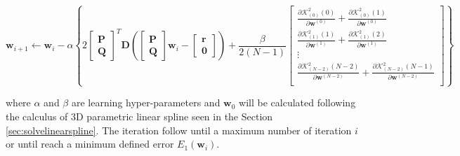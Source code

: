 \begin{equation}
\mathbf{w}_{i+1}
\leftarrow 
\mathbf{w}_{i}
-
\alpha
\left\{
2
\begin{bmatrix}
\mathbf{P}\\
\mathbf{Q}
\end{bmatrix}^{T}
\mathbf{D}
\left(
\begin{bmatrix}
\mathbf{P}\\
\mathbf{Q}
\end{bmatrix}
\mathbf{w}_{i}
-
\begin{bmatrix}
\mathbf{r}\\
\mathbf{0}
\end{bmatrix}
\right)
+
\frac{\beta}{2(N-1)}
\begin{bmatrix}
%
\frac{
\partial 
\mathcal{K}_{(0)}^{2}(0)
}{\partial \mathbf{w}^{(0)}}
+
\frac{
\partial 
\mathcal{K}_{(0)}^{2}(1)
}{\partial \mathbf{w}^{(0)}}\\[4pt]
%
\frac{
\partial 
\mathcal{K}_{(1)}^{2}(1)
}{\partial \mathbf{w}^{(1)}}
+
\frac{
\partial 
\mathcal{K}_{(1)}^{2}(2)
}{\partial \mathbf{w}^{(1)}}\\[4pt]
%
\vdots\\[4pt]
\frac{
\partial 
\mathcal{K}_{(N-2)}^{2}(N-2)
}{\partial \mathbf{w}^{(N-2)}}
+
\frac{
\partial 
\mathcal{K}_{(N-2)}^{2}(N-1)
}{\partial \mathbf{w}^{(N-2)}}\\
%
\end{bmatrix}
\right\}
\end{equation}

where $\alpha$ and $\beta$ are learning hyper-parameters and 
$\mathbf{w}_{0}$ 
will be calculated following the calculus of 3D parametric linear spline
seen in the Section \ref{sec:solvelinearspline}.
The iteration follow until a maximum number of iteration $i$ or until reach a
minimum defined error $E_1(\mathbf{w}_{i})$. 

